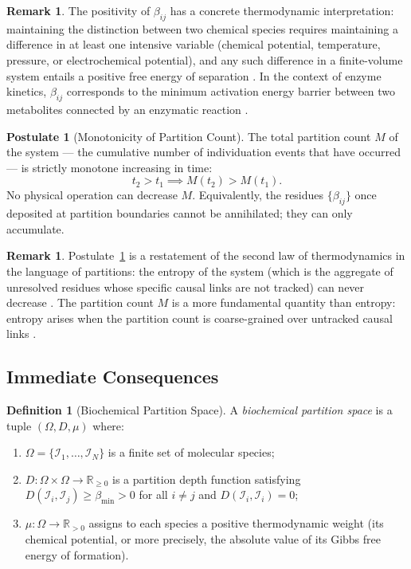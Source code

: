 \documentclass[11pt,twocolumn]{article}
\theoremstyle{plain}
\theoremstyle{definition}
\newtheorem{definition}[theorem]{Definition}
\newtheorem{remark}[theorem]{Remark}
\newtheorem{postulate}{Postulate}
\newcommand{\betamin}{\beta_{\min}}
\newcommand{\reals}{\mathbb{R}}
\begin{document}
\begin{remark}
The positivity of $\beta_{ij}$ has a concrete thermodynamic interpretation:
maintaining the distinction between two chemical species requires maintaining
a difference in at least one intensive variable (chemical potential, temperature,
pressure, or electrochemical potential), and any such difference in a
finite-volume system entails a positive free energy of separation
\cite{atkins2014physical, denbigh1981principles}. In the context of enzyme
kinetics, $\beta_{ij}$ corresponds to the minimum activation energy barrier
between two metabolites connected by an enzymatic reaction
\cite{cornishbowden2012fundamentals}.
\end{remark}

\begin{postulate}[Monotonicity of Partition Count]
\label{post:monotone}
The total partition count $M$ of the system --- the cumulative number of
individuation events that have occurred --- is strictly monotone increasing in
time:
\[
  t_2 > t_1 \implies M(t_2) > M(t_1).
\]
No physical operation can decrease $M$. Equivalently, the residues
$\{\beta_{ij}\}$ once deposited at partition boundaries cannot be annihilated;
they can only accumulate.
\end{postulate}

\begin{remark}
Postulate~\ref{post:monotone} is a restatement of the second law of
thermodynamics in the language of partitions: the entropy of the system
(which is the aggregate of unresolved residues whose specific causal links are
not tracked) can never decrease \cite{kondepudi2014modern, prigogine1967introduction}.
The partition count $M$ is a more fundamental quantity than entropy: entropy
arises when the partition count is coarse-grained over untracked causal links
\cite{shannon1948mathematical, jaynes1957information}.
\end{remark}

\subsection{Immediate Consequences}

\begin{definition}[Biochemical Partition Space]
\label{def:partition_space}
A \emph{biochemical partition space} is a tuple $(\Omega, D, \mu)$ where:
\begin{enumerate}[label=(\alph*)]
\item $\Omega = \{\mathcal{I}_1, \ldots, \mathcal{I}_N\}$ is a finite set of
  molecular species;
\item $D: \Omega \times \Omega \to \reals_{\geq 0}$ is a partition depth
  function satisfying $D(\mathcal{I}_i, \mathcal{I}_j) \geq \betamin > 0$ for
  all $i \neq j$ and $D(\mathcal{I}_i, \mathcal{I}_i) = 0$;
\item $\mu: \Omega \to \reals_{>0}$ assigns to each species a positive
  thermodynamic weight (its chemical potential, or more precisely, the absolute
  value of its Gibbs free energy of formation).
\end{enumerate}
\end{definition}
\end{document}
